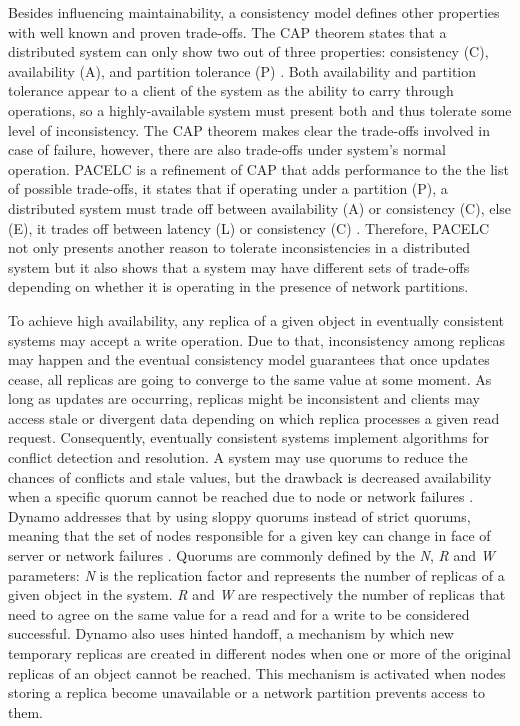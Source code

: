 \documentclass[man,floatsintext,12pt]{apa6}
\begin{document}
Besides influencing maintainability, a consistency model defines other
properties with well known and proven trade-offs. The CAP theorem states that a
distributed system can only show two out of three properties: consistency (C),
availability (A), and partition tolerance (P) \parencite{Brewer2000,Gilbert2002}.
Both availability and partition tolerance appear to a client of the system as
the ability to carry through operations, so a highly-available system must
present both and thus tolerate some level of inconsistency. The CAP theorem
makes clear the trade-offs involved in case of failure, however, there are also
trade-offs under system's normal operation. PACELC is a refinement of CAP that
adds performance to the the list of possible trade-offs, it states that if
operating under a partition (P), a distributed system must trade off between
availability (A) or consistency (C), else (E), it trades off between latency
(L) or consistency (C) \parencite{Abadi2012}. Therefore, PACELC not only
presents another reason to tolerate inconsistencies in a distributed system but 
it also shows that a system may have different sets of trade-offs depending on
whether it is operating in the presence of network partitions.

To achieve high availability, any replica of a given object in eventually
consistent systems may accept a write operation. Due to that, inconsistency
among replicas may happen and the eventual consistency model guarantees that
once updates cease, all replicas are going to converge to the same value at
some moment. As long as updates are occurring, replicas might be inconsistent
and clients may access stale or divergent data depending on which replica
processes a given read request. Consequently, eventually consistent systems
implement algorithms for conflict detection and resolution. A system may use
quorums to reduce the chances of conflicts and stale values, but the drawback
is decreased availability when a specific quorum cannot be reached due to node
or network failures \parencite{Vogels2009}. Dynamo addresses that by using
sloppy quorums instead of strict quorums, meaning that the set of nodes
responsible for a given key can change in face of server or network failures
\parencite{DeCandia2007}.  Quorums are commonly defined by the \textit{N},
\textit{R} and \textit{W} parameters: \textit{N} is the replication factor and
represents the number of replicas of a given object in the system. \textit{R}
and \textit{W} are respectively the number of replicas that need to agree on
the same value for a read and for a write to be considered successful. Dynamo
also uses hinted handoff, a mechanism by which new temporary replicas are
created in different nodes when one or more of the original replicas of an
object cannot be reached.  This mechanism is activated when nodes storing a
replica become unavailable or a network partition prevents access to them.
\end{document}
